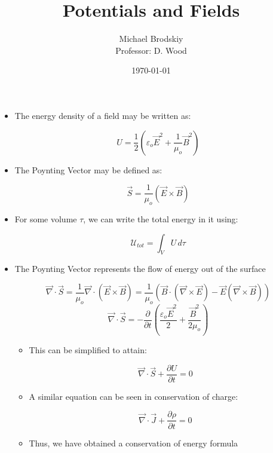 


\title{Potentials and Fields}
\date{\today}
\author{Michael Brodskiy\\ \small Professor: D. Wood}



\maketitle

\begin{itemize}

  \item The energy density of a field may be written as:

    $$U=\frac{1}{2}\left( \varepsilon_o\vec{E}^2+\frac{1}{\mu_o}\vec{B}^2 \right)$$

  \item The Poynting Vector may be defined as:

    $$\vec{S}=\frac{1}{\mu_o}(\vec{E}\times\vec{B})$$

  \item For some volume $\tau$, we can write the total energy in it using:

    $$\mathcal{U}_{tot}=\int_V U\,d\tau$$

  \item The Poynting Vector represents the flow of energy out of the surface

    $$\vec{\nabla}\cdot\vec{S}=\frac{1}{\mu_o}\vec{\nabla}\cdot(\vec{E}\times\vec{B})=\frac{1}{\mu_o}\left( \vec{B}\cdot(\vec{\nabla}\times\vec{E})-\vec{E}(\vec{\nabla}\times\vec{B}) \right)$$
    $$\vec{\nabla}\cdot\vec{S}=-\frac{\partial}{\partial t}\left( \frac{\varepsilon_o\vec{E}^2}{2}+\frac{\vec{B}^2}{2\mu_o} \right)$$

    \begin{itemize}

      \item This can be simplified to attain:

        $$\vec{\nabla}\cdot\vec{S}+\frac{\partial U}{\partial t}=0$$

      \item A similar equation can be seen in conservation of charge:

        $$\vec{\nabla}\cdot\vec{J}+\frac{\partial \rho}{\partial t}=0$$

      \item Thus, we have obtained a conservation of energy formula

    \end{itemize}

\end{itemize}



